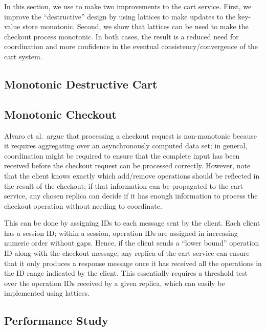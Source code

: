 In this section, we use \lang to make two improvements to the cart
service. First, we improve the ``destructive'' design by using lattices to make
updates to the key-value store monotonic. Second, we show that lattices can be
used to make the checkout process monotonic. In both cases, the result is a
reduced need for coordination and more confidence in the eventual
consistency/convergence of the cart system.

\subsection{Monotonic Destructive Cart}

\subsection{Monotonic Checkout}
Alvaro et al.\ argue that processing a checkout request is non-monotonic because
it requires aggregating over an asynchronously computed data set; in general,
coordination might be required to ensure that the complete input has been
received before the checkout request can be processed correctly. However, note
that the client knows exactly which add/remove operations should be reflected in
the result of the checkout; if that information can be propagated to the cart
service, any chosen replica can decide if it has enough information to process
the checkout operation without needing to coordinate.

This can be done by assigning IDs to each message sent by the client. Each
client has a session ID; within a session, operation IDs are assigned in
increasing numeric order without gaps. Hence, if the client sends a ``lower
bound'' operation ID along with the checkout message, any replica of the cart
service can ensure that it only produces a response message once it has received
all the operations in the ID range indicated by the client. This essentially
requires a threshold test over the operation IDs received by a given replica,
which can easily be implemented using lattices.

\subsection{Performance Study}
